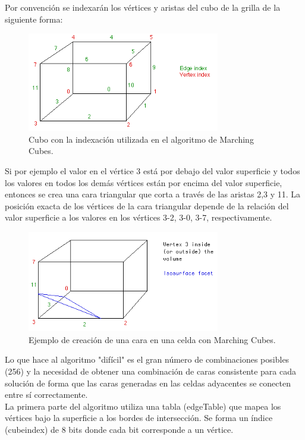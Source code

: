 \documentclass[12pt]{article}
\begin{document}
Por convención se indexarán los vértices y aristas del cubo de la grilla de la siguiente forma:
\begin{figure}[h!]
\includegraphics[width=0.75\textwidth,center]{marchingcubes1.png}
\caption{Cubo con la indexación utilizada en el algoritmo de Marching Cubes.}
\end{figure}

Si por ejemplo el valor en el vértice 3 está por debajo del valor superficie y todos los valores en todos los demás vértices están por encima del valor superficie, entonces se crea una cara triangular que corta a través de las aristas 2,3 y 11. La posición exacta de los vértices de la cara triangular depende de la relación del valor superficie a los valores en los vértices 3-2, 3-0, 3-7, respectivamente.
\begin{figure}[h!]
\includegraphics[width=0.75\textwidth,center]{marchingcubes2.png}
\caption{Ejemplo de creación de una cara en una celda con Marching Cubes.}
\end{figure}
Lo que hace al algoritmo "difícil" es el gran número de combinaciones posibles (256) y la necesidad de obtener una combinación de caras consistente para cada solución de forma que las caras generadas en las celdas adyacentes se conecten entre sí correctamente.\\
La primera parte del algoritmo utiliza una tabla (edgeTable) que mapea los vértices bajo la superficie a los bordes de intersección. Se forma un índice (cubeindex) de 8 bits donde cada bit corresponde a un vértice.
\lstset{language=C}          %
\end{document}
